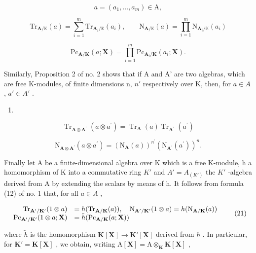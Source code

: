 \[
a = (a _ {1}, \dots , a _ {m}) \in \mathrm{A},
\]

\[
\mathrm{Tr} _ {\mathbf {A} / \mathbb {K}} (a) = \sum_ {i = 1} ^ {m} \mathrm{Tr} _ {\mathbf {A} _ {i} / \mathbb {K}} (a _ {i}), \qquad \mathrm{N} _ {\mathbf {A} / \mathbb {K}} (a) = \prod_ {i = 1} ^ {m} \mathrm{N} _ {\mathbf {A} _ {i} / \mathbb {K}} (a _ {i})\tag{18}
\]

\[
\mathrm{Pc} _ {\mathbf {A} / \mathbf {K}} (a; \mathbf {X}) = \prod_ {i = 1} ^ {m} \mathrm{Pc} _ {\mathbf {A} _ {i} / \mathbf {K}} (a _ {i}; \mathbf {X}).
\]

Similarly, Proposition 2 of no. 2 shows that if A and A' are two algebras, which are free K-modules, of finite dimensions n, \(n'\) respectively over K, then, for \(a \in A\) , \(a' \in A'\) .

\begin{enumerate}
\def\labelenumi{(\arabic{enumi})}
\setcounter{enumi}{18}
\tightlist
\item
\end{enumerate}

\[
\operatorname{Tr} _ {\mathbf {A} \otimes \mathbf {A} ^ {\prime}} (a \otimes a ^ {\prime}) = \operatorname{Tr} _ {\mathbf {A}} (a) \operatorname{Tr} _ {\mathbf {A} ^ {\prime}} (a ^ {\prime})\tag{20}
\]

\[
\mathrm{N} _ {\mathbf {A} \otimes \mathbf {A} ^ {\prime}} (a \otimes a ^ {\prime}) = (\mathrm{N} _ {\mathbf {A}} (a)) ^ {n ^ {\prime}} (\mathrm{N} _ {\mathbf {A} ^ {\prime}} (a ^ {\prime})) ^ {n}.
\]

Finally let A be a finite-dimensional algebra over K which is a free K-module, h a homomorphism of K into a commutative ring \(K'\) and \(A' = A_{(K')}\) the \(K'\) -algebra derived from A by extending the scalars by means of h. It follows from formula (12) of no. 1 that, for all \(a \in A\) ,

\[
\begin{array}{r l} \mathrm{Tr} _ {\mathbf {A} ^ {\prime} / \mathbf {K} ^ {\prime}} (1 \otimes a) & = h (\mathrm{Tr} _ {\mathbf {A} / \mathbf {K}} (a)), \quad \mathrm{N} _ {\mathbf {A} ^ {\prime} / \mathbf {K} ^ {\prime}} (1 \otimes a) = h (\mathrm{N} _ {\mathbf {A} / \mathbf {K}} (a)) \\ \mathrm{Pc} _ {\mathbf {A} ^ {\prime} / \mathbf {K} ^ {\prime}} (1 \otimes a; \mathbf {X}) & = \tilde {h} (\mathrm{Pc} _ {\mathbf {A} / \mathbf {K}} (a; \mathbf {X})) \end{array}\tag{21}
\]

where \(\tilde{h}\) is the homomorphism \(\mathbf{K}[\mathbf{X}] \to \mathbf{K}'[\mathbf{X}]\) derived from \(h\) . In particular, for \(\mathbf{K}' = \mathbf{K}[\mathbf{X}]\) , we obtain, writing \(\mathrm{A}[\mathbf{X}] = \mathrm{A} \otimes_{\mathbf{K}} \mathbf{K}[\mathbf{X}]\) ,

